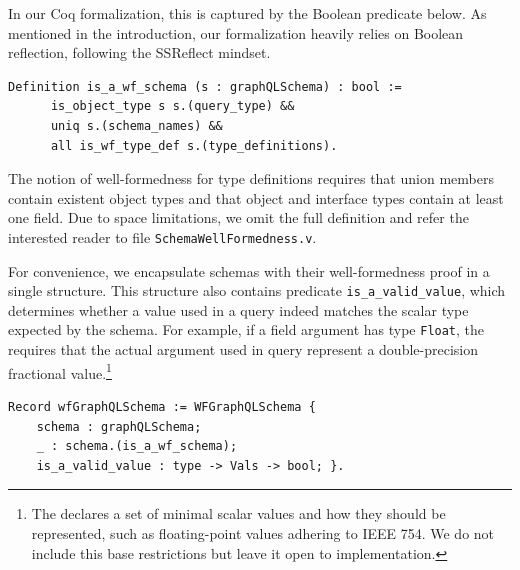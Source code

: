 In our Coq formalization, this is captured by the Boolean predicate below. As mentioned in the introduction, our formalization heavily relies on Boolean reflection, following the SSReflect mindset.
%
\begin{verbatim}
Definition is_a_wf_schema (s : graphQLSchema) : bool :=
      is_object_type s s.(query_type) &&
      uniq s.(schema_names) &&
      all is_wf_type_def s.(type_definitions).
\end{verbatim}
%
The notion of well-formedness for type definitions requires \eg that union members contain existent object types and that object and interface types contain at least one field. Due to space limitations, we omit the full definition and refer the interested reader to file \texttt{SchemaWellFormedness.v}.




For convenience, we encapsulate schemas with their well-formedness proof in a single structure. This structure also contains predicate \texttt{is_a_valid_value}, which determines whether a value used in a query indeed matches the scalar type expected by the schema. For example, if a field argument has type \texttt{Float}, the \spec requires that the actual argument used in query represent a double-precision fractional value.\footnote{The \spec{} declares a set of minimal scalar values and how they should be represented, such as floating-point values adhering to IEEE 754. We do not include this base restrictions but leave it open to implementation.}
%
\begin{verbatim}
Record wfGraphQLSchema := WFGraphQLSchema {
    schema : graphQLSchema;
    _ : schema.(is_a_wf_schema);
    is_a_valid_value : type -> Vals -> bool; }.
\end{verbatim}

